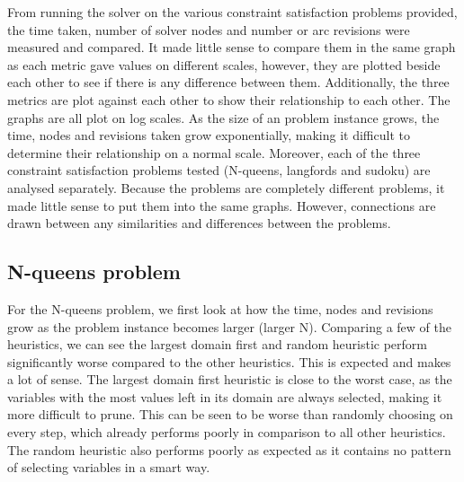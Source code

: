 \documentclass{article}
\begin{document}
From running the solver on the various constraint satisfaction problems provided, the time taken, number of solver nodes and number or arc revisions were measured and compared. It made little sense to compare them in the same graph as each metric gave values on different scales, however, they are plotted beside each other to see if there is any difference between them. Additionally, the three metrics are plot against each other to show their relationship to each other. The graphs are all plot on log scales. As the size of an problem instance grows, the time, nodes and revisions taken grow exponentially, making it difficult to determine their relationship on a normal scale. Moreover, each of the three constraint satisfaction problems tested (N-queens, langfords and sudoku) are analysed separately. Because the problems are completely different problems, it made little sense to put them into the same graphs. However, connections are drawn between any similarities and differences between the problems. 


\subsection{N-queens problem}
For the N-queens problem, we first look at how the time, nodes and revisions grow as the problem instance becomes larger (larger N). Comparing a few of the heuristics, we can see the largest domain first and random heuristic perform significantly worse compared to the other heuristics. This is expected and makes a lot of sense. The largest domain first heuristic is close to the worst case, as the variables with the most values left in its domain are always selected, making it more difficult to prune. This can be seen to be worse than randomly choosing on every step, which already performs poorly in comparison to all other heuristics. The random heuristic also performs poorly as expected as it contains no pattern of selecting variables in a smart way. 
\end{document}
